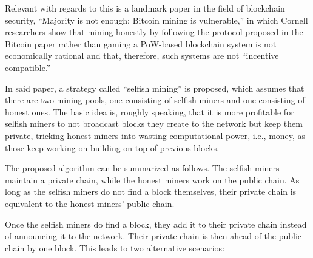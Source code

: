 Relevant with regards to this is a landmark paper in the field of blockchain security, ``Majority is not enough: Bitcoin mining is vulnerable,'' \autocite{eyal2014} in which  Cornell researchers show that mining honestly by following the protocol proposed in the Bitcoin paper rather than gaming a PoW-based blockchain system is not economically rational and that, therefore, such systems are not ``incentive compatible.''

In said paper, a strategy called ``selfish mining'' is proposed, which assumes that there are two mining pools, one consisting of selfish miners and one consisting of honest ones.
The basic idea is, roughly speaking, that it is more profitable for selfish miners to not broadcast blocks they create to the network but keep them private, tricking honest miners into wasting computational power, i.e., money, as those keep working on building on top of previous blocks.

The proposed algorithm can be summarized as follows.
The selfish miners maintain a private chain, while the honest miners work on the public chain.
As long as the selfish miners do not find a block themselves, their private chain is equivalent to the honest miners’ public chain.

Once the selfish miners do find a block, they add it to their private chain instead of announcing it to the network.
Their private chain is then ahead of the public chain by one block.
This leads to two alternative scenarios:

